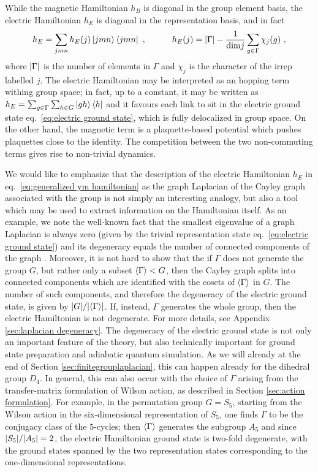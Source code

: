 While the magnetic Hamiltonian $h_B$ is diagonal in the group element basis, the electric Hamiltonian $h_E$ is diagonal in the representation basis, and in fact
\begin{equation}
    \label{eq:electric hamiltonian rep basis}
    h_E = \sum_{jmn} h_E(j) \ket{jmn}\bra{jmn} \ , \quad \quad \quad h_E(j)=\abs{\Gamma} - \frac{1}{\dim{j}} \sum_{g \in \Gamma} \chi_j(g)\ ,
\end{equation}
where $\abs{\Gamma}$ is the number of elements in $\Gamma$ and $\chi_j$ is the character of the irrep labelled $j$.
The electric Hamiltonian may be interpreted as an  hopping term withing group space; in fact, up to a constant, it may be written as $h_E = \sum_{g \in \Gamma} \sum_{h \in G} \ket{gh}\bra{h}$ and it favours each link to sit in the electric ground state eq.~\eqref{eq:electric ground state}, which is fully delocalized in group space.
On the other hand, the magnetic term is a plaquette-based potential which pushes plaquettes close to the identity.
The competition between the two non-commuting terms gives rise to non-trivial dynamics.

We would like to emphasize that the description of the electric Hamiltonian $h_E$ in eq.~\eqref{eq:generalized ym hamiltonian} as the graph Laplacian of the Cayley graph associated with the group is not simply an interesting analogy, but also a tool which may be used to extract information on the Hamiltonian itself.
As an example, we note the well-known fact that the smallest eigenvalue of a graph Laplacian is always zero (given by the trivial representation state eq.~\eqref{eq:electric ground state}) and its degeneracy equals the number of connected components of the graph \cite{spectralgraphtheory}.
Moreover, it is not hard to show that the if $\Gamma$ does not generate the group $G$, but rather only a subset $\expval{\Gamma} < G$, then the Cayley graph splits into connected components which are identified with the cosets of $\expval{\Gamma}$ in $G$.
The number of such components, and therefore the degeneracy of the electric ground state, is given by $\abs{G}/\abs{\expval{\Gamma}}$.
If, instead, $\Gamma$ generates the whole group, then the electric Hamiltonian is not degenerate.
For more details, see Appendix \ref{sec:laplacian degeneracy}.
The degeneracy of the electric ground state is not only an important feature of the theory, but also technically important for ground state preparation and adiabatic quantum simulation.
As we will already at the end of Section \ref{sec:finitegrouplaplacian}, this can happen already for the dihedral group $D_4$.
In general, this can also occur with the choice of $\Gamma$ arising from the transfer-matrix formulation of Wilson action, as described in Section \ref{sec:action formulation}.
For example, in the permutation group $G=S_5$, starting from the Wilson action in the six-dimensional representation of $S_5$, one finds $\Gamma$ to be the conjugacy class of the $5$-cycles; then $\expval{\Gamma}$ generates the subgroup $A_5$ and since $\abs{S_5}/\abs{A_5}=2$, the electric Hamiltonian ground state is two-fold degenerate, with the ground states spanned by the two representation states corresponding to the one-dimensional representations.

